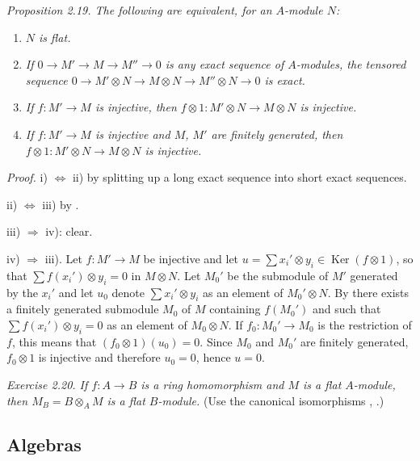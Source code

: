 \noindent\textit{Proposition 2.19. The following are equivalent, for an $A$-module $N$:}
\begin{enumerate}
\renewcommand{\labelenumi}{\roman{enumi})}
\item \textit{$N$ is flat.}
\item \textit{If $0\longrightarrow M'\longrightarrow M\longrightarrow M''\longrightarrow0$ is any exact sequence of $A$-modules, the tensored sequence $0\longrightarrow M'\otimes N\longrightarrow M\otimes N\longrightarrow M''\otimes N\longrightarrow0$ is exact.}
\item \textit{If $f:M'\longrightarrow M$ is injective, then $f\otimes1:M'\otimes N\longrightarrow M\otimes N$ is injective.}
\item \textit{If $f:M'\longrightarrow M$ is injective and $M$, $M'$ are finitely generated, then $f\otimes1:M'\otimes N\longrightarrow M\otimes N$ is injective.}
\end{enumerate}

\noindent\textit{Proof.} i) $\Longleftrightarrow$ ii) by splitting up a long exact sequence into short exact sequences.

ii) $\Longleftrightarrow$ iii) by .

iii) $\Rightarrow$ iv): clear.

iv) $\Rightarrow$ iii). Let $f:M'\longrightarrow M$ be injective and let $u=\sum x_i'\otimes y_i\in\operatorname{Ker}(f\otimes1)$, so that $\sum f(x_i')\otimes y_i=0$ in $M\otimes N$. Let $M_0'$ be the submodule of $M'$ generated by the $x_i'$ and let $u_0$ denote $\sum x_i'\otimes y_i$ as an element of $M_0'\otimes N$. By  there exists a finitely generated submodule $M_0$ of $M$ containing $f(M_0')$ and such that $\sum f(x_i')\otimes y_i=0$ as an element of $M_0\otimes N$. If $f_0:M_0'\longrightarrow M_0$ is the restriction of $f$, this means that $(f_0\otimes1)(u_0)=0$. Since $M_0$ and $M_0'$ are finitely generated, $f_0\otimes1$ is injective and therefore $u_0=0$, hence $u=0$. \proofbox

\noindent\textit{Exercise 2.20. If $f:A\longrightarrow B$ is a ring homomorphism and $M$ is a flat $A$-module, then $M_B=B\otimes_A M$ is a flat $B$-module.} (Use the canonical isomorphisms , .)

\subsection{Algebras}


